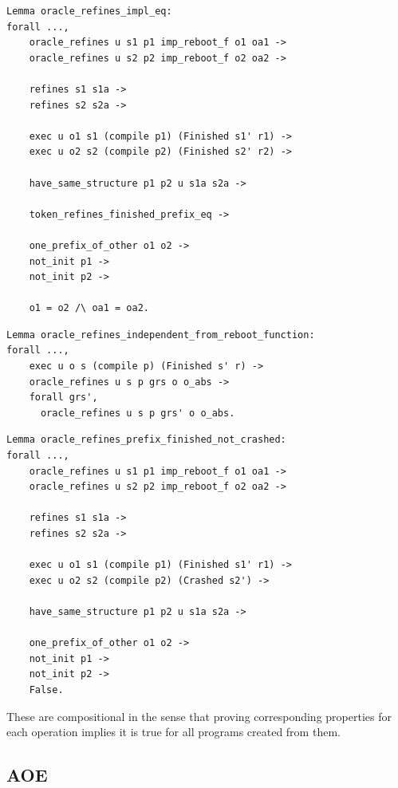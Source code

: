 \begin{verbatim}
Lemma oracle_refines_impl_eq:
forall ...,
    oracle_refines u s1 p1 imp_reboot_f o1 oa1 ->
    oracle_refines u s2 p2 imp_reboot_f o2 oa2 ->
    
    refines s1 s1a ->
    refines s2 s2a ->
    
    exec u o1 s1 (compile p1) (Finished s1' r1) ->
    exec u o2 s2 (compile p2) (Finished s2' r2) ->
    
    have_same_structure p1 p2 u s1a s2a ->
    
    token_refines_finished_prefix_eq ->
    
    one_prefix_of_other o1 o2 ->
    not_init p1 ->
    not_init p2 ->
    
    o1 = o2 /\ oa1 = oa2.
\end{verbatim}

\begin{verbatim}
Lemma oracle_refines_independent_from_reboot_function:
forall ...,
    exec u o s (compile p) (Finished s' r) ->
    oracle_refines u s p grs o o_abs ->
    forall grs', 
      oracle_refines u s p grs' o o_abs.
\end{verbatim}

\begin{verbatim}
Lemma oracle_refines_prefix_finished_not_crashed:
forall ...,
    oracle_refines u s1 p1 imp_reboot_f o1 oa1 ->
    oracle_refines u s2 p2 imp_reboot_f o2 oa2 ->
    
    refines s1 s1a ->
    refines s2 s2a ->
    
    exec u o1 s1 (compile p1) (Finished s1' r1) ->
    exec u o2 s2 (compile p2) (Crashed s2') ->
    
    have_same_structure p1 p2 u s1a s2a ->
    
    one_prefix_of_other o1 o2 ->
    not_init p1 ->
    not_init p2 ->
    False.
\end{verbatim}

These are compositional in the sense that proving corresponding properties for 
each operation implies it is true for all programs created from them. 

\subsection{AOE}
\fi